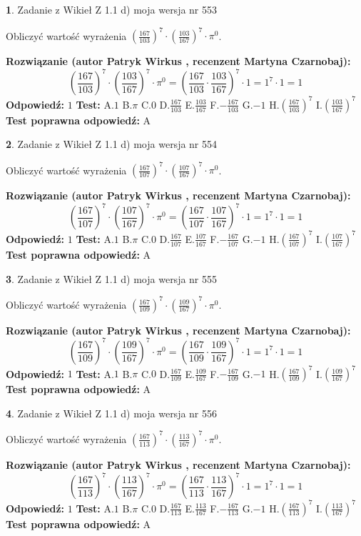 \documentclass[12pt, a4paper]{article}
\theoremstyle{definition} %
\newtheorem{zad}{}
\newcommand{\zadStart}[1]{\begin{zad}#1\newline}
\newcommand{\zadStop}{\end{zad}}
\newcommand{\rozwStart}[2]{\noindent \textbf{Rozwiązanie (autor #1 , recenzent #2): }\newline}
\newcommand{\rozwStop}{\newline}
\newcommand{\odpStart}{\noindent \textbf{Odpowiedź:}\newline}
\newcommand{\odpStop}{\newline}
\newcommand{\testStart}{\noindent \textbf{Test:}\newline}
\newcommand{\testStop}{\newline}
\newcommand{\kluczStart}{\noindent \textbf{Test poprawna odpowiedź:}\newline}
\newcommand{\kluczStop}{\newline}
\begin{document}
\zadStart{Zadanie z Wikieł Z 1.1 d) moja wersja nr 553}

Obliczyć wartość wyrażenia $(\frac{167}{103})^{7} \cdot (\frac{103}{167})^{7} \cdot \pi^{0}$.
\zadStop
\rozwStart{Patryk Wirkus}{Martyna Czarnobaj}
$$(\frac{167}{103})^{7} \cdot (\frac{103}{167})^{7} \cdot \pi^{0} = (\frac{167}{103} \cdot \frac{103}{167})^{7} \cdot 1 = 1^{7} \cdot 1 = 1$$
\rozwStop
\odpStart
$1$
\odpStop
\testStart
A.$1$ B.$\pi$ C.$0$ D.$\frac{167}{103}$ E.$\frac{103}{167}$
F.$-\frac{167}{103}$ G.$-1$
H.$(\frac{167}{103})^{7}$
I.$(\frac{103}{167})^{7}$
\testStop
\kluczStart
A
\kluczStop



\zadStart{Zadanie z Wikieł Z 1.1 d) moja wersja nr 554}

Obliczyć wartość wyrażenia $(\frac{167}{107})^{7} \cdot (\frac{107}{167})^{7} \cdot \pi^{0}$.
\zadStop
\rozwStart{Patryk Wirkus}{Martyna Czarnobaj}
$$(\frac{167}{107})^{7} \cdot (\frac{107}{167})^{7} \cdot \pi^{0} = (\frac{167}{107} \cdot \frac{107}{167})^{7} \cdot 1 = 1^{7} \cdot 1 = 1$$
\rozwStop
\odpStart
$1$
\odpStop
\testStart
A.$1$ B.$\pi$ C.$0$ D.$\frac{167}{107}$ E.$\frac{107}{167}$
F.$-\frac{167}{107}$ G.$-1$
H.$(\frac{167}{107})^{7}$
I.$(\frac{107}{167})^{7}$
\testStop
\kluczStart
A
\kluczStop



\zadStart{Zadanie z Wikieł Z 1.1 d) moja wersja nr 555}

Obliczyć wartość wyrażenia $(\frac{167}{109})^{7} \cdot (\frac{109}{167})^{7} \cdot \pi^{0}$.
\zadStop
\rozwStart{Patryk Wirkus}{Martyna Czarnobaj}
$$(\frac{167}{109})^{7} \cdot (\frac{109}{167})^{7} \cdot \pi^{0} = (\frac{167}{109} \cdot \frac{109}{167})^{7} \cdot 1 = 1^{7} \cdot 1 = 1$$
\rozwStop
\odpStart
$1$
\odpStop
\testStart
A.$1$ B.$\pi$ C.$0$ D.$\frac{167}{109}$ E.$\frac{109}{167}$
F.$-\frac{167}{109}$ G.$-1$
H.$(\frac{167}{109})^{7}$
I.$(\frac{109}{167})^{7}$
\testStop
\kluczStart
A
\kluczStop



\zadStart{Zadanie z Wikieł Z 1.1 d) moja wersja nr 556}

Obliczyć wartość wyrażenia $(\frac{167}{113})^{7} \cdot (\frac{113}{167})^{7} \cdot \pi^{0}$.
\zadStop
\rozwStart{Patryk Wirkus}{Martyna Czarnobaj}
$$(\frac{167}{113})^{7} \cdot (\frac{113}{167})^{7} \cdot \pi^{0} = (\frac{167}{113} \cdot \frac{113}{167})^{7} \cdot 1 = 1^{7} \cdot 1 = 1$$
\rozwStop
\odpStart
$1$
\odpStop
\testStart
A.$1$ B.$\pi$ C.$0$ D.$\frac{167}{113}$ E.$\frac{113}{167}$
F.$-\frac{167}{113}$ G.$-1$
H.$(\frac{167}{113})^{7}$
I.$(\frac{113}{167})^{7}$
\testStop
\kluczStart
A
\kluczStop
\end{document}
